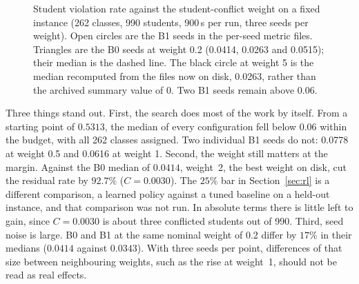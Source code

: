 \documentclass[journal]{IEEEtran}
\begin{document}
\begin{figure}[t]
\centering
{}
\caption{Student violation rate against the student-conflict weight on a fixed instance (262 classes, 990 students, 900\,s per run, three seeds per weight). Open circles are the B1 seeds in the per-seed metric files. Triangles are the B0 seeds at weight 0.2 (0.0414, 0.0263 and 0.0515); their median is the dashed line. The black circle at weight 5 is the median recomputed from the files now on disk, 0.0263, rather than the archived summary value of 0. Two B1 seeds remain above 0.06.}
\label{fig:sweep}
\end{figure}

Three things stand out. First, the search does most of the work by itself. From a starting point of $0.5313$, the median of every configuration fell below $0.06$ within the budget, with all 262 classes assigned. Two individual B1 seeds do not: 0.0778 at weight 0.5 and 0.0616 at weight 1. Second, the weight still matters at the margin. Against the B0 median of $0.0414$, weight~2, the best weight on disk, cut the residual rate by $92.7\%$ ($C=0.0030$). The $25\%$ bar in Section~\ref{sec:rl} is a different comparison, a learned policy against a tuned baseline on a held-out instance, and that comparison was not run. In absolute terms there is little left to gain, since $C=0.0030$ is about three conflicted students out of 990. Third, seed noise is large. B0 and B1 at the same nominal weight of 0.2 differ by $17\%$ in their medians ($0.0414$ against $0.0343$). With three seeds per point, differences of that size between neighbouring weights, such as the rise at weight~1, should not be read as real effects.
\end{document}
